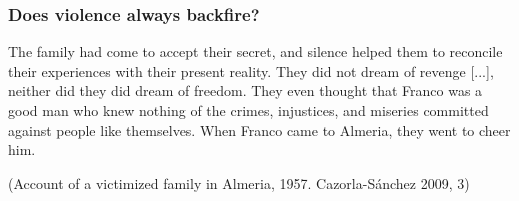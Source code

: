 \documentclass[aspectratio=43]{beamer}
\begin{document}
\begin{frame}
\frametitle{Does violence always backfire?}
\centering

{\small The family had come to accept their secret, and silence helped them to reconcile their experiences with their present reality. They did not dream of revenge [...], neither did they did dream of freedom. {\color{red} They even thought that Franco was a good man who knew nothing of the crimes, injustices, and miseries committed against people like themselves.} When Franco came to Almeria, they went to cheer him.}

{\scriptsize (Account of a victimized family in Almeria, 1957. Cazorla-Sánchez 2009, 3)}\\

\end{frame}
\end{document}
